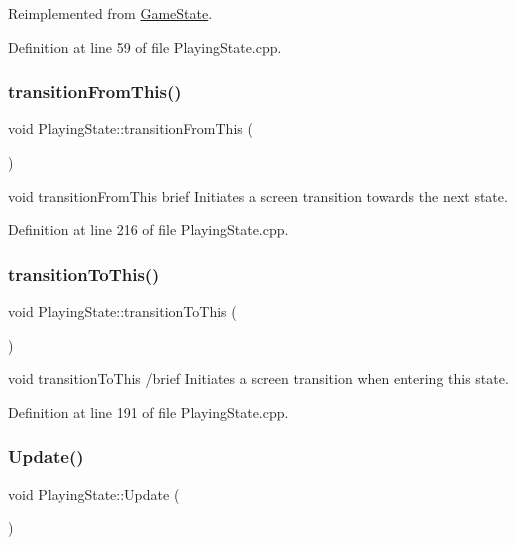 Reimplemented from \hyperlink{class_game_state_a8bce2828cee99ae7c07322804531fd01}{Game\+State}.



Definition at line 59 of file Playing\+State.\+cpp.

\mbox{\label{class_playing_state_a15418b49381b61c98d6b9cdc5d3a83d1}} 
\subsubsection{\texorpdfstring{transition\+From\+This()}{transitionFromThis()}}
{\footnotesize\ttfamily void Playing\+State\+::transition\+From\+This (\begin{DoxyParamCaption}{ }\end{DoxyParamCaption})}

void transition\+From\+This brief Initiates a screen transition towards the next state. 

Definition at line 216 of file Playing\+State.\+cpp.

\mbox{\label{class_playing_state_af3c78b678960f69e5130ca84c1761d1f}} 
\subsubsection{\texorpdfstring{transition\+To\+This()}{transitionToThis()}}
{\footnotesize\ttfamily void Playing\+State\+::transition\+To\+This (\begin{DoxyParamCaption}{ }\end{DoxyParamCaption})}

void transition\+To\+This /brief Initiates a screen transition when entering this state. 

Definition at line 191 of file Playing\+State.\+cpp.

\mbox{\label{class_playing_state_afb7ccd732dfaad4397b5096876092136}} 
\subsubsection{\texorpdfstring{Update()}{Update()}}
{\footnotesize\ttfamily void Playing\+State\+::\+Update (\begin{DoxyParamCaption}{ }\end{DoxyParamCaption})\hspace{0.3cm}{\ttfamily [virtual]}}




